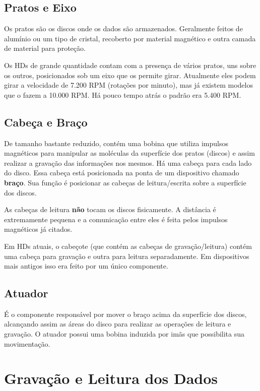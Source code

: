 \subsection{Pratos e Eixo}

Os pratos são os discos onde os dados são armazenados. Geralmente feitos de alumínio ou um tipo de cristal, recoberto por material magnético e outra camada de material para proteção.

Os HDs de grande quantidade contam com a presença de vários pratos, uns sobre os outros, posicionados sob um eixo que os permite girar. Atualmente eles podem girar a velocidade de 7.200 RPM (rotações por minuto), mas já existem modelos que o fazem a 10.000 RPM. Há pouco tempo atrás o padrão era 5.400 RPM.

\subsection{Cabeça e Braço}

De tamanho bastante reduzido, contém uma bobina que utiliza impulsos magnéticos para manipular as moléculas da superfície dos pratos (discos) e assim realizar a gravação das informações nos mesmos. Há uma cabeça para cada lado do disco. Essa cabeça está posicionada na ponta de um dispositivo chamado \textbf{braço}. Sua função é posicionar as cabeças de leitura/escrita sobre a superfície dos discos.

As cabeças de leitura \textbf{não} tocam os discos fisicamente. A distância é extremamente pequena e a comunicação entre eles é feita pelos impulsos magnéticos já citados.

Em HDs atuais, o cabeçote (que contém as cabeças de gravação/leitura) contém uma cabeça para gravação e outra para leitura separadamente. Em dispositivos mais antigos isso era feito por um único componente.

\subsection{Atuador}

É o componente responsável por mover o braço acima da superfície dos discos, alcançando assim as áreas do disco para realizar as operações de leitura e gravação. O atuador possui uma bobina induzida por imãs que possibilita sua movimentação.

\section{Gravação e Leitura dos Dados}

